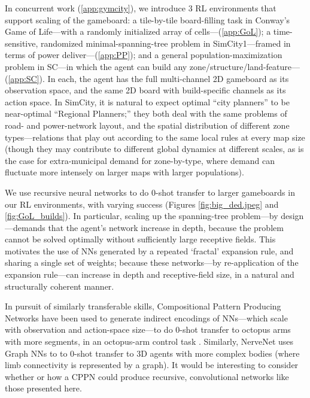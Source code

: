 \documentclass{article}
\begin{document}
In concurrent work (\ref{app:gymcity}), we introduce 3 RL environments that support scaling of the gameboard: a tile-by-tile board-filling task in Conway's Game of Life---with a randomly initialized array of cells---(\ref{app:GoL}); a time-sensitive, randomized minimal-spanning-tree problem in SimCity1---framed in terms of power deliver---(\ref{app:PP}); and a general population-maximization problem in SC---in which the agent can build any zone/structure/land-feature---(\ref{app:SC}).
In each, the agent has the full multi-channel 2D gameboard as its observation space, and the same 2D board with build-specific channels as its action space.
In SimCity, it is natural to expect optimal ``city planners'' to be near-optimal ``Regional Planners;'' they both deal with the same problems of road- and power-network layout, and the spatial distribution of different zone types---relations that play out according to the same local rules at every map size (though they may contribute to different global dynamics at different scales, as is the case for extra-municipal demand for zone-by-type, where demand can fluctuate more intensely on larger maps with larger populations).

We use recursive neural networks to do $0$-shot transfer to larger gameboards in our RL environments, with varying success (Figures \ref{fig:big_ded.jpeg} and \ref{fig:GoL_builds}).
In particular, scaling up the spanning-tree problem---by design---demands that the agent's network increase in depth, because the problem cannot be solved optimally without sufficiently large receptive fields.
This motivates the use of NNs generated by a repeated `fractal' expansion rule, and sharing a single set of weights; because these networks---by re-application of the expansion rule---can increase in depth and receptive-field size, in a natural and structurally coherent manner. 

In pursuit of similarly transferable skills, Compositional Pattern Producing Networks have been used to generate indirect encodings of NNs---which scale with observation and action-space size---to do $0$-shot transfer to octopus arms with more segments, in an octopus-arm control task \cite{woolley2010evolving}.
Similarly, NerveNet \cite{wang2018nervenet} uses Graph NNs to to $0$-shot transfer to 3D agents with more complex bodies (where limb connectivity is represented by a graph).
It would be interesting to consider whether or how a CPPN could produce recursive, convolutional networks like those presented here.
\end{document}
